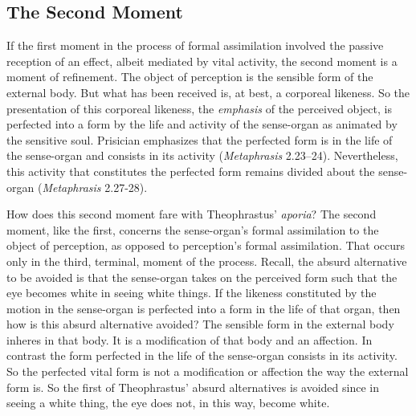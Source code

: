 \documentclass[12pt]{article}
\begin{document}

\subsection{The Second Moment} %
\label{sub:the_second_moment}

If the first moment in the process of formal assimilation involved the passive reception of an effect, albeit mediated by vital activity, the second moment is a moment of refinement. The object of perception is the sensible form of the external body. But what has been received is, at best, a corporeal likeness. So the presentation of this corporeal likeness, the \emph{emphasis} of the perceived object, is perfected into a form by the life and activity of the sense-organ as animated by the sensitive soul. Prisician emphasizes that the perfected form is in the life of the sense-organ and consists in its activity (\emph{Metaphrasis} 2.23--24). Nevertheless, this activity that constitutes the perfected form remains divided about the sense-organ (\emph{Metaphrasis} 2.27-28).

How does this second moment fare with Theophrastus' \emph{aporia}? The second moment, like the first, concerns the sense-organ's formal assimilation to the object of perception, as opposed to perception's formal assimilation. That occurs only in the third, terminal, moment of the process. Recall, the absurd alternative to be avoided is that the sense-organ takes on the perceived form such that the eye becomes white in seeing white things. If the likeness constituted by the motion in the sense-organ is perfected into a form in the life of that organ, then how is this absurd alternative avoided? The sensible form in the external body inheres in that body. It is a modification of that body and an affection. In contrast the form perfected in the life of the sense-organ consists in its activity. So the perfected vital form is not a modification or affection the way the external form is. So the first of Theophrastus' absurd alternatives is avoided since in seeing a white thing, the eye does not, in this way, become white.
\end{document}

